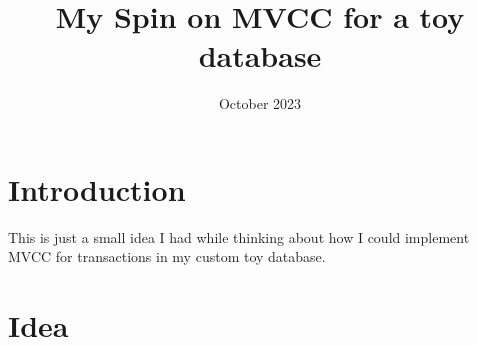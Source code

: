 \documentclass{article}
\title{My Spin on MVCC for a toy database}
\date{October 2023}
\begin{document}
\section{Introduction}
This is just a small idea I had while thinking about how I could implement MVCC for transactions in my custom
toy database.

\section{Idea}
\end{document}
